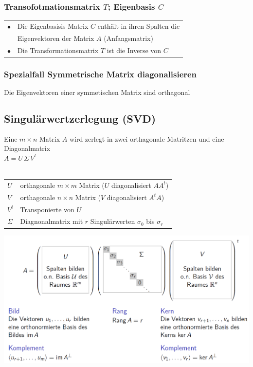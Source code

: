 			
			

			\subsubsection{Transofotmationsmatrix $T$; Eigenbasis $C$}
			\begin{tabular}{ll}
			$\bullet$ & Die Eigenbasisis-Matrix $C$ enthält in ihren Spalten die \\
			& Eigenvektoren der Matrix $A$ (Anfangsmatrix) \\
			$\bullet$ & Die Transformationsmatrix $T$ ist die Inverse von $C$ \\
			\end{tabular}
			
			\subsubsection{Spezialfall Symmetrische Matrix diagonalisieren}
		    
			Die Eigenvektoren einer symmetischen Matrix sind orthagonal \\
		   
		   
		   \subsection{Singulärwertzerlegung (SVD)}
			Eine $m \times n$ Matrix $A$ wird zerlegt in zwei orthagonale Matritzen und eine Diagonalmatrix \\
			$A = U \, \Sigma \, V^t$	 \\	  
			\\
			\begin{tabular}{ll}
			$U$ & orthagonale $m \times m$ Matrix  ($U$ diagonalisiert $AA^t$)\\
			$V$ & orthagonale $n \times n$ Matrix ($V$ diagonalisiert $A^tA$)\\
			$V^t$ & Transponierte von $U$ \\
			$\Sigma$ & Diagnonalmatrix mit $r$ Singulärwerten $\sigma_0$ bis $\sigma_r$ \\
			\end{tabular}			 
		   
		   \includegraphics[width=0.65\linewidth]{Bilder/SVD} \\
		   
